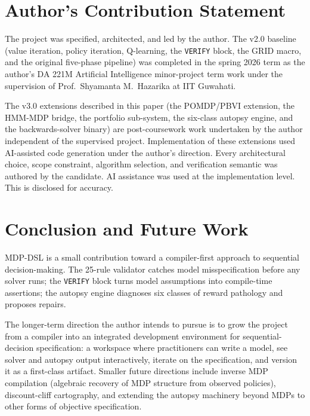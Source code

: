 \documentclass[conference]{IEEEtran}
\begin{document}
\section{Author's Contribution Statement}

The project was specified, architected, and led by the author. The
v2.0 baseline (value iteration, policy iteration, Q-learning, the
\texttt{VERIFY} block, the GRID macro, and the original five-phase
pipeline) was completed in the spring 2026 term as the author's
DA 221M Artificial Intelligence minor-project term work under the
supervision of Prof.\ Shyamanta M.\ Hazarika at IIT Guwahati.

The v3.0 extensions described in this paper (the POMDP/PBVI
extension, the HMM-MDP bridge, the portfolio sub-system, the
six-class autopsy engine, and the backwards-solver binary) are
post-coursework work undertaken by the author independent of the
supervised project. Implementation of these extensions used
AI-assisted code generation under the author's direction. Every
architectural choice, scope constraint, algorithm selection, and
verification semantic was authored by the candidate. AI assistance
was used at the implementation level. This is disclosed for
accuracy.

\section{Conclusion and Future Work}

MDP-DSL is a small contribution toward a compiler-first approach to
sequential decision-making. The 25-rule validator catches model
misspecification before any solver runs; the \texttt{VERIFY} block
turns model assumptions into compile-time assertions; the autopsy
engine diagnoses six classes of reward pathology and proposes
repairs.

The longer-term direction the author intends to pursue is to grow
the project from a compiler into an integrated development
environment for sequential-decision specification: a workspace where
practitioners can write a model, see solver and autopsy output
interactively, iterate on the specification, and version it as a
first-class artifact. Smaller future directions include inverse MDP
compilation (algebraic recovery of MDP structure from observed
policies), discount-cliff cartography, and extending the autopsy
machinery beyond MDPs to other forms of objective specification.
\end{document}
